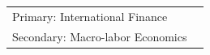 \begin{longtable}[l]{@{}p{} p{}}

    Primary: International Finance \\

    Secondary: Macro-labor Economics\\

\end{longtable}